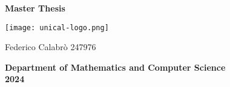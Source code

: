 \vspace*{\fill}
\begin{center}
    \large\textbf{Master Thesis}
    
    \vspace{1.5cm}
    \texttt{[image: unical-logo.png]}
    \vspace{1cm}
    
    \large Federico Calabrò 247976
    
    \vspace{2cm}
    
    \large\textbf{Department of Mathematics and Computer Science \\ 2024}
\end{center}
\vspace*{\fill}